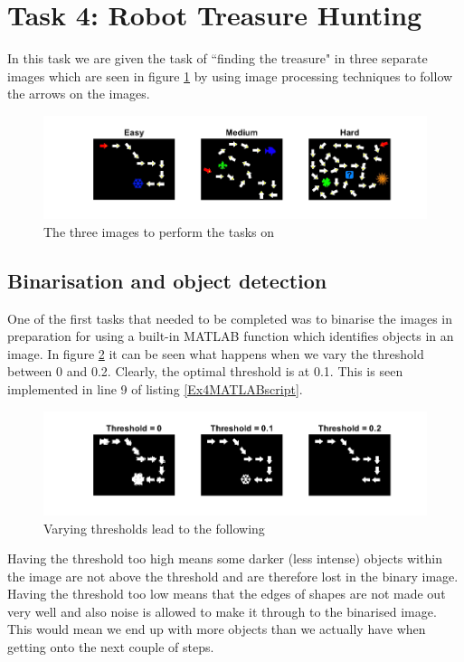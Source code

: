 \documentclass[11pt, letterpaper]{article}
\begin{document}
\section{Task 4: Robot Treasure Hunting}
In this task we are given the task of ``finding the treasure" in three separate images which are seen in figure \ref{fig:threeTreasures} by using image processing techniques to follow the arrows on the images.
\begin{figure}[ht]
    \centering
    \includegraphics[width=1\linewidth]{Lab 4/threeTreasuresCropped.png}
    \caption{The three images to perform the tasks on}
    \label{fig:threeTreasures}
\end{figure}

\subsection{Binarisation and object detection}
One of the first tasks that needed to be completed was to binarise the images in preparation for using a built-in MATLAB function which identifies objects in an image. In figure \ref{fig:varyingThresholds} it can be seen what happens when we vary the threshold between 0 and 0.2. Clearly, the optimal threshold is at 0.1. This is seen implemented in line 9 of listing \ref{Ex4MATLABscript}.
\begin{figure}[ht]
    \centering
    \includegraphics[width=1\linewidth]{Lab 4/varyingThresholdsCropped.png}
    \caption{Varying thresholds lead to the following}
    \label{fig:varyingThresholds}
\end{figure}
Having the threshold too high means some darker (less intense) objects within the image are not above the threshold and are therefore lost in the binary image. Having the threshold too low means that the edges of shapes are not made out very well and also noise is allowed to make it through to the binarised image. This would mean we end up with more objects than we actually have when getting onto the next couple of steps.
\end{document}
